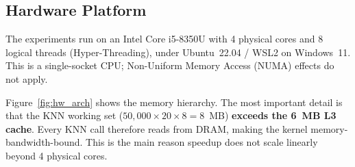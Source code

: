 \documentclass[12pt,a4paper]{article}
\begin{document}
\subsection{Hardware Platform}
\label{sec:hw_platform}

The experiments run on an Intel Core i5-8350U with 4 physical cores and 8
logical threads (Hyper-Threading), under Ubuntu~22.04 / WSL2 on Windows~11.
This is a single-socket CPU; Non-Uniform Memory Access (NUMA) effects do
not apply.

Figure~\ref{fig:hw_arch} shows the memory hierarchy. The most important
detail is that the KNN working set ($50{,}000 \times 20 \times 8 = 8$~MB)
\textbf{exceeds the 6~MB L3 cache}. Every KNN call therefore reads from DRAM,
making the kernel memory-bandwidth-bound. This is the main reason speedup
does not scale linearly beyond 4 physical cores.
\end{document}
